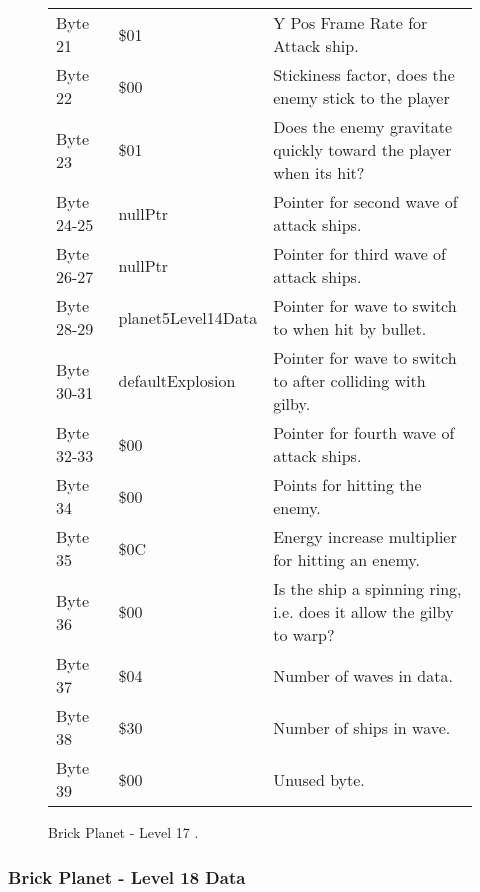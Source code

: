 \begin{figure}[H]
{\begin{adjustbox}{width=12cm}
\begin{tabular}{lll}
 Byte 21    & \$01                & Y Pos Frame Rate for Attack ship.                                   \\
 Byte 22    & \$00                & Stickiness factor, does the enemy stick to the player               \\
 Byte 23    & \$01                & Does the enemy gravitate quickly toward the player when its hit?    \\
 Byte 24-25 & nullPtr            & Pointer for second wave of attack ships.                            \\
 Byte 26-27 & nullPtr            & Pointer for third wave of attack ships.                             \\
 Byte 28-29 & planet5Level14Data & Pointer for wave to switch to when hit by bullet.                   \\
 Byte 30-31 & defaultExplosion   & Pointer for  wave to switch to after colliding with gilby.          \\
 Byte 32-33 & \$00                & Pointer for fourth wave of attack ships.                            \\
 Byte 34    & \$00                & Points for hitting the enemy.                                       \\
 Byte 35    & \$0C                & Energy increase multiplier for hitting an enemy.                    \\
 Byte 36    & \$00                & Is the ship a spinning ring, i.e. does it allow the gilby to warp?  \\
 Byte 37    & \$04                & Number of waves in data.                                            \\
 Byte 38    & \$30                & Number of ships in wave.                                            \\
 Byte 39    & \$00                & Unused byte.                                                        \\
\bottomrule
\end{tabular}

  \end{adjustbox}

  }\caption*{Brick Planet - Level 17
.}
\end{figure}

\clearpage
\subsubsection{Brick Planet - Level 18 Data}

